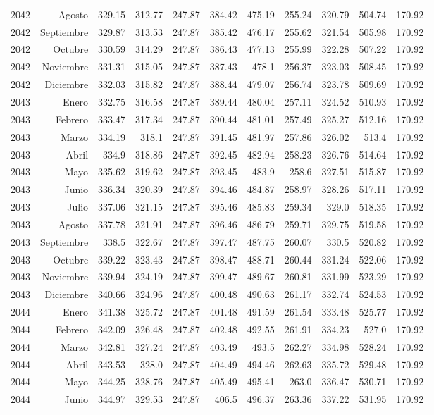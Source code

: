 \documentclass{article}%
\begin{document}
\begin{longtable}{|l r|r|r|r|r|r|r|r|r|r|}
2042&Agosto&329.15&312.77&247.87&384.42&475.19&255.24&320.79&504.74&170.92\\%
2042&Septiembre&329.87&313.53&247.87&385.42&476.17&255.62&321.54&505.98&170.92\\%
2042&Octubre&330.59&314.29&247.87&386.43&477.13&255.99&322.28&507.22&170.92\\%
2042&Noviembre&331.31&315.05&247.87&387.43&478.1&256.37&323.03&508.45&170.92\\%
2042&Diciembre&332.03&315.82&247.87&388.44&479.07&256.74&323.78&509.69&170.92\\%
2043&Enero&332.75&316.58&247.87&389.44&480.04&257.11&324.52&510.93&170.92\\%
2043&Febrero&333.47&317.34&247.87&390.44&481.01&257.49&325.27&512.16&170.92\\%
2043&Marzo&334.19&318.1&247.87&391.45&481.97&257.86&326.02&513.4&170.92\\%
2043&Abril&334.9&318.86&247.87&392.45&482.94&258.23&326.76&514.64&170.92\\%
2043&Mayo&335.62&319.62&247.87&393.45&483.9&258.6&327.51&515.87&170.92\\%
2043&Junio&336.34&320.39&247.87&394.46&484.87&258.97&328.26&517.11&170.92\\%
2043&Julio&337.06&321.15&247.87&395.46&485.83&259.34&329.0&518.35&170.92\\%
2043&Agosto&337.78&321.91&247.87&396.46&486.79&259.71&329.75&519.58&170.92\\%
2043&Septiembre&338.5&322.67&247.87&397.47&487.75&260.07&330.5&520.82&170.92\\%
2043&Octubre&339.22&323.43&247.87&398.47&488.71&260.44&331.24&522.06&170.92\\%
2043&Noviembre&339.94&324.19&247.87&399.47&489.67&260.81&331.99&523.29&170.92\\%
2043&Diciembre&340.66&324.96&247.87&400.48&490.63&261.17&332.74&524.53&170.92\\%
2044&Enero&341.38&325.72&247.87&401.48&491.59&261.54&333.48&525.77&170.92\\%
2044&Febrero&342.09&326.48&247.87&402.48&492.55&261.91&334.23&527.0&170.92\\%
2044&Marzo&342.81&327.24&247.87&403.49&493.5&262.27&334.98&528.24&170.92\\%
2044&Abril&343.53&328.0&247.87&404.49&494.46&262.63&335.72&529.48&170.92\\%
2044&Mayo&344.25&328.76&247.87&405.49&495.41&263.0&336.47&530.71&170.92\\%
2044&Junio&344.97&329.53&247.87&406.5&496.37&263.36&337.22&531.95&170.92\\%

\end{longtable}
\end{document}
